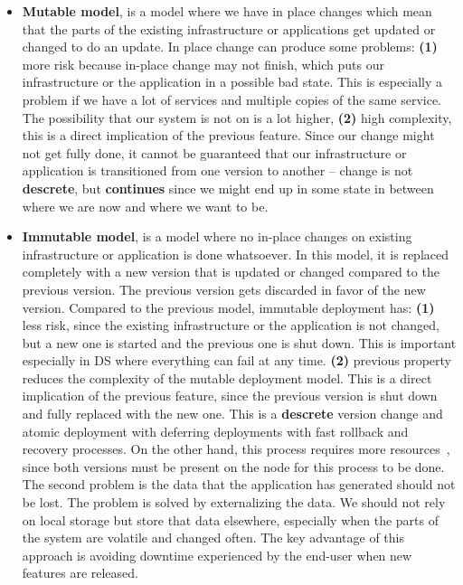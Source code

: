 \begin{itemize}
	\item \textbf{Mutable model}, is a model where we have in place changes which mean that the parts of the existing infrastructure or applications get updated or changed to do an update. In place change can produce some problems: \textbf{(1)} more risk because in-place change may not finish, which puts our infrastructure or the application in a possible bad state. This is especially a problem if we have a lot of services and multiple copies of the same service. The possibility that our system is not on is a lot higher, \textbf{(2)} high complexity, this is a direct implication of the previous feature. Since our change might not get fully done, it cannot be guaranteed that our infrastructure or application is transitioned from one version to another -- change is not \textbf{descrete}, but \textbf{continues} since we might end up in some state in between where we are now and where we want to be.
	\item \textbf{Immutable model}, is a model where no in-place changes on existing infrastructure or application is done whatsoever. In this model, it is replaced completely with a new version that is updated or changed compared to the previous version. The previous version gets discarded in favor of the new version. Compared to the previous model, immutable deployment has: \textbf{(1)} less risk, since the existing infrastructure or the application is not changed, but a new one is started and the previous one is shut down. This is important especially in DS where everything can fail at any time. \textbf{(2)} previous property reduces the complexity of the mutable deployment model. This is a direct implication of the previous feature, since the previous version is shut down and fully replaced with the new one. This is a \textbf{descrete} version change and atomic deployment with deferring deployments with fast rollback and recovery processes. On the other hand, this process requires more resources~\cite{Helland16}, since both versions must be present on the node for this process to be done. The second problem is the data that the application has generated should not be lost. The problem is solved by externalizing the data. We should not rely on local storage but store that data elsewhere, especially when the parts of the system are volatile and changed often. The key advantage of this approach is avoiding downtime experienced by the end-user when new features are released.
\end{itemize}

